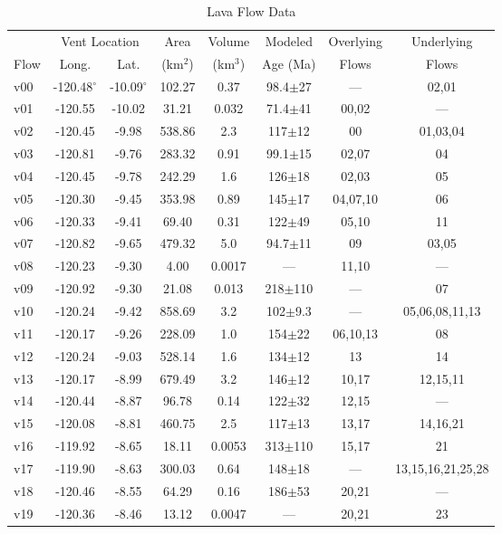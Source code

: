 \documentclass[12pt,letter]{article}
\begin{document}
	\begin{table}[h!]
	\centering
	\caption{Lava Flow Data}
	\begin{tabular}{l c c c c c c c}
		\toprule
			 & \multicolumn{2}{c}{Vent Location}  & Area & Volume & Modeled & Overlying & Underlying\\
			Flow & Long. & Lat. & (km$^2$) & (km$^3$) & Age (Ma) & Flows & Flows\\
		\midrule
			v00 & -120.48$^{\circ}$ & -10.09$^{\circ}$ & 102.27 & 0.37 & 98.4$\pm$27 & --- & 02,01\\
			v01 & -120.55 & -10.02 & 31.21 & 0.032 & 71.4$\pm$41 & 00,02 & ---\\
			v02 & -120.45 & -9.98 & 538.86 & 2.3 & 117$\pm$12 & 00 & 01,03,04\\
			v03 & -120.81 & -9.76 & 283.32 & 0.91 & 99.1$\pm$15 & 02,07 & 04\\
			v04 & -120.45 & -9.78 & 242.29 & 1.6 & 126$\pm$18 & 02,03 & 05\\
			v05 & -120.30 & -9.45 & 353.98 & 0.89 & 145$\pm$17 & 04,07,10 & 06\\
			v06 & -120.33 & -9.41 & 69.40 & 0.31 & 122$\pm$49 & 05,10 & 11\\
			v07 & -120.82 & -9.65 & 479.32 & 5.0 & 94.7$\pm$11 & 09 & 03,05\\
			v08 & -120.23 & -9.30 & 4.00 & 0.0017 & --- & 11,10 & ---\\
			v09 & -120.92 & -9.30 & 21.08 & 0.013 & 218$\pm$110 & --- & 07\\
			v10 & -120.24 & -9.42 & 858.69 & 3.2 & 102$\pm$9.3 & --- & 05,06,08,11,13\\
			v11 & -120.17 & -9.26 & 228.09 & 1.0 & 154$\pm$22 & 06,10,13 & 08\\
			v12 & -120.24 & -9.03 & 528.14 & 1.6 & 134$\pm$12 & 13 & 14\\
			v13 & -120.17 & -8.99 & 679.49 & 3.2 & 146$\pm$12 & 10,17 & 12,15,11\\
			v14 & -120.44 & -8.87 & 96.78 & 0.14 & 122$\pm$32 & 12,15 & ---\\
			v15 & -120.08 & -8.81 & 460.75 & 2.5 & 117$\pm$13 & 13,17 & 14,16,21\\
			v16 & -119.92 & -8.65 & 18.11 & 0.0053 & 313$\pm$110 & 15,17 & 21\\
			v17 & -119.90 & -8.63 & 300.03 & 0.64 & 148$\pm$18 & --- & 13,15,16,21,25,28\\
			v18 & -120.46 & -8.55 & 64.29 & 0.16 & 186$\pm$53 & 20,21 & ---\\
			v19 & -120.36 & -8.46 & 13.12 & 0.0047 & --- & 20,21 & 23\\

\end{tabular}
\end{table}
\end{document}
